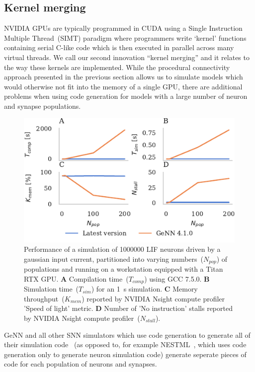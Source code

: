 \documentclass[9pt,twocolumn,twoside,lineno]{pnas-new}
\begin{document}
\subsection*{Kernel merging}
NVIDIA GPUs are typically programmed in CUDA using a Single Instruction Multiple Thread~(SIMT) paradigm where programmers write `kernel' functions containing serial C-like code which is then executed in parallel across many virtual threads.
We call our second innovation ``kernel merging'' and it relates to the way these kernels are implemented.
While the procedural connectivity approach presented in the previous section allows us to simulate models which would otherwise not fit into the memory of a single GPU, there are additional problems when using code generation for models with a large number of neuron and synapse populations.
%
\begin{figure}
    \centering
    \includegraphics{figures/merging_scaling}
    \caption{Performance of a simulation of \num{1000000} LIF neurons driven by a gaussian input current, partitioned into varying numbers~($N_{pop}$) of populations and running on a workstation equipped with a Titan RTX GPU.
    \textbf{A} Compilation time~($T_{comp}$) using GCC 7.5.0.
    \textbf{B} Simulation time~($T_{sim}$) for an \SI{1}{\second} simulation.
    \textbf{C} Memory throughput~($K_{mem}$) reported by NVIDIA Nsight compute profiler 'Speed of light' metric.
    \textbf{D} Number of 'No instruction' stalls reported by NVIDIA Nsight compute profiler~($N_{stall}$).}
    \label{fig:merging_scaling}
\end{figure}
%
GeNN and all other SNN simulators which use code generation to generate all of their simulation code~\citep{Blundell2018} (as opposed to, for example NESTML~\citep{Plotnikov2016}, which uses code generation only to generate neuron simulation code) generate seperate pieces of code for each population of neurons and synapses.
\end{document}
